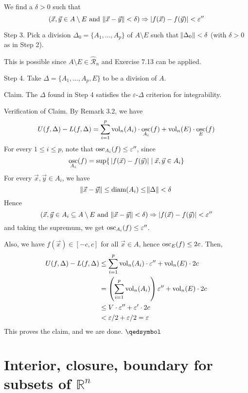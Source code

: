 \documentclass[11pt]{article}
\theoremstyle{definition}
\newcommand{\R}{\ensuremath{\mathbb{R}}}
\begin{document}
We find a $\delta > 0$ such that
$$(\vec{x}, \vec{y} \in A \setminus E \text{ and } \norm{\vec{x} - \vec{y}} < \delta) \Rightarrow |f(\vec{x}) - f(\vec{y})| < \varepsilon''$$

{\sc Step 3.} Pick a division $\Delta_0 = \{A_1, \dots, A_p\}$ of $A \setminus E$ such that $\norm{\Delta_0} < \delta$ (with $\delta > 0$ as in Step 2).

This is possible since $A \setminus E \in \widehat{\mathcal{R}}_n$ and Exercise 7.13 can be applied.

{\sc Step 4.} Take $\Delta = \{A_1, \dots, A_p, E\}$ to be a division of $A$.

{\sc Claim.} The $\Delta$ found in Step 4 satisfies the $\varepsilon$-$\Delta$ criterion for integrability.

{\sc Verification of Claim.} By Remark 3.2, we have
$$U(f, \Delta) - L(f, \Delta) = \sum_{i=1}^p {\rm vol}_n (A_i) \cdot \underset{A_i}{\rm osc}(f) + {\rm vol}_n (E) \cdot \underset{E}{\rm osc}(f)$$
For every $1 \leq i \leq p$, note that ${\rm osc}_{A_i}(f) \leq \varepsilon''$, since
$$\underset{A_i}{\rm osc}(f) = \sup\{\,|f(\vec{x}) - f(\vec{y})| \mid \vec{x}, \vec{y} \in A_i\}$$
For every $\vec{x}, \vec{y} \in A_i$, we have
$$\norm{\vec{x} - \vec{y}} \leq {\rm diam}(A_i) \leq \norm{\Delta} < \delta$$
Hence
$$(\vec{x}, \vec{y} \in A_i \subseteq A \setminus E \text{ and } \norm{\vec{x} - \vec{y}} < \delta) \Rightarrow |f(\vec{x}) - f(\vec{y})| < \varepsilon''$$
and taking the supremum, we get ${\rm osc}_{A_i}(f) \leq \varepsilon''$. 

Also, we have $f(\vec{x}) \in [-c, c]$ for all $\vec{x} \in A$, hence ${\rm osc}_E(f) \leq 2c$. Then,
\begin{align*}
    U(f, \Delta) - L(f, \Delta) 
    &\leq \sum_{i=1}^p {\rm vol}_n(A_i) \cdot \varepsilon'' + {\rm vol}_n(E) \cdot 2c \\
    &= \left( \sum_{i=1}^p {\rm vol}_n(A_i) \right) \varepsilon'' + {\rm vol}_n(E) \cdot 2c \\
    &\leq V \cdot \varepsilon'' + \varepsilon' \cdot 2c \\
    &< \varepsilon/2 + \varepsilon/2 = \varepsilon
\end{align*}
This proves the claim, and we are done. \hfill $\qedsymbol$

\newpage
\section{Interior, closure, boundary for subsets of $\R^n$}
\end{document}
